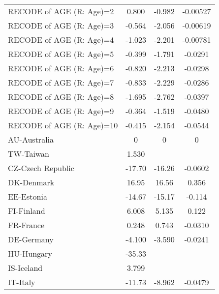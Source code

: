 \begin{table}[htbp]
\begin{tabular}{l*{3}{c}}
RECODE of AGE (R: Age)=2&       0.800         &      -0.982         &    -0.00527         \\
RECODE of AGE (R: Age)=3&      -0.564         &      -2.056         &    -0.00619         \\
RECODE of AGE (R: Age)=4&      -1.023         &      -2.201         &    -0.00781         \\
RECODE of AGE (R: Age)=5&      -0.399         &      -1.791         &     -0.0291         \\
RECODE of AGE (R: Age)=6&      -0.820         &      -2.213         &     -0.0298         \\
RECODE of AGE (R: Age)=7&      -0.833         &      -2.229         &     -0.0286         \\
RECODE of AGE (R: Age)=8&      -1.695         &      -2.762\sym{*}  &     -0.0397\sym{*}  \\
RECODE of AGE (R: Age)=9&      -0.364         &      -1.519         &     -0.0480\sym{**} \\
RECODE of AGE (R: Age)=10&      -0.415         &      -2.154         &     -0.0544\sym{**} \\
AU-Australia        &           0         &           0         &           0         \\
TW-Taiwan           &       1.530         &                     &                     \\
CZ-Czech Republic   &      -17.70\sym{***}&      -16.26\sym{***}&     -0.0602\sym{**} \\
DK-Denmark          &       16.95\sym{***}&       16.56\sym{***}&       0.356\sym{***}\\
EE-Estonia          &      -14.67\sym{***}&      -15.17\sym{***}&      -0.114\sym{***}\\
FI-Finland          &       6.008\sym{***}&       5.135\sym{**} &       0.122\sym{***}\\
FR-France           &       0.248         &       0.743         &     -0.0310         \\
DE-Germany          &      -4.100\sym{**} &      -3.590\sym{*}  &     -0.0241         \\
HU-Hungary          &      -35.33\sym{***}&                     &                     \\
IS-Iceland          &       3.799\sym{*}  &                     &                     \\
IT-Italy            &      -11.73\sym{***}&      -8.962\sym{***}&     -0.0479\sym{*}  \\

\end{tabular}
\end{table}
